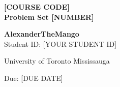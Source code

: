 
\begin{titlepage}
    \null
    \vfill
    \begin{center}

        {\fontsize{48}{60}\selectfont \bfseries [COURSE CODE]}
        \vspace{20pt} \\

        {\fontsize{24}{30}\selectfont \bfseries Problem Set [NUMBER]} \\
        \vspace{40pt}

        {\fontsize{18}{22}\selectfont \textbf{AlexanderTheMango}} \\
        \vspace{8pt}
        {\fontsize{14}{18}\selectfont Student ID: [YOUR STUDENT ID]} \\
        \vspace{25pt}

        {\fontsize{16}{20}\selectfont University of Toronto Mississauga} \\
        \vspace{30pt}

        {\fontsize{14}{18}\selectfont Due: [DUE DATE]}

    \end{center}
    \vfill
\end{titlepage}

\newpage